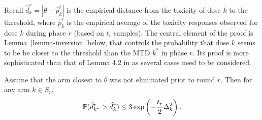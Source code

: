 Recall $\hat{d}_k^r = |\theta - \hat{p}_k^t|$ is the empirical distance from the toxicity of dose $k$ to the threshold, where $\hat{p}_k^r$ is the empirical average of the toxicity responses observed for dose $k$ during phase $r$ (based on $t_r$ samples). The central element of the proof is Lemma~\ref{lemma-inversion} below, that controls the probability that dose $k$ seems to be be closer to the threshold than the MTD $k^*$ in phase $r$. Its proof is more sophisticated than that of Lemma 4.2 in \cite{icml2013_karnin13} as several cases need to be considered. 
%
%
\begin{lemma}
\label{lemma-inversion}
Assume that the arm closest to $\theta$ was not eliminated
prior to round $r$.
Then for any arm $k \in S_r$,
\begin{equation}\mathbb{P}(\hat{d}^r_{k^*} > \hat{d}^r_k) \leq 3 \exp\left(- \frac{t_r}{2}\Delta_k^2\right).\label{toproofin4case}\end{equation}
\end{lemma}
%
%
